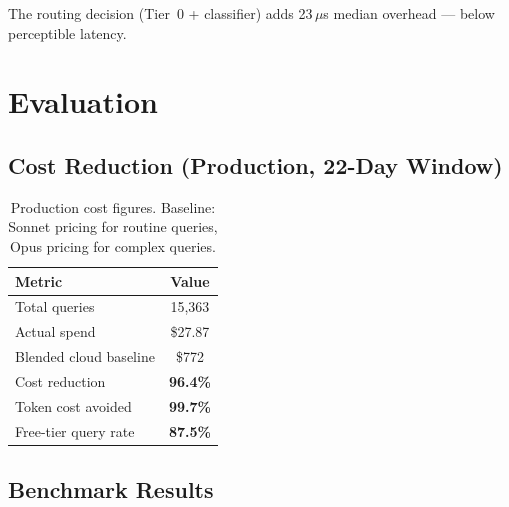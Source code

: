 \documentclass[11pt]{article}
\begin{document}
The routing decision (Tier~0 + classifier) adds 23\,$\mu$s median
overhead --- below perceptible latency.

\section{Evaluation}

\subsection{Cost Reduction (Production, 22-Day Window)}

\begin{table}[t]
\centering
\small
\begin{tabular}{lc}
\toprule
\textbf{Metric} & \textbf{Value} \\
\midrule
Total queries & 15,363 \\
Actual spend & \$27.87 \\
Blended cloud baseline & \$772 \\
Cost reduction & \textbf{96.4\%} \\
Token cost avoided & \textbf{99.7\%} \\
Free-tier query rate & \textbf{87.5\%} \\
\bottomrule
\end{tabular}
\caption{Production cost figures. Baseline: Sonnet pricing for routine queries, Opus pricing for complex queries.}
\label{tab:cost}
\end{table}

\subsection{Benchmark Results}
\end{document}
